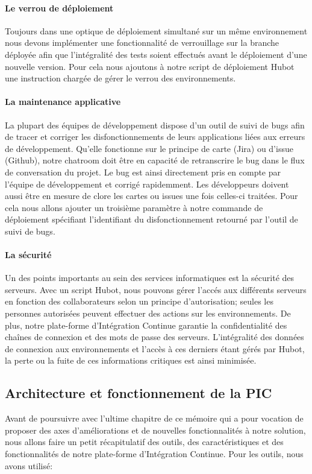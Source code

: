           \paragraph{Le verrou de déploiement} Toujours dans une optique de déploiement simultané sur un même environnement nous devons implémenter une fonctionnalité de verrouillage sur la branche déployée afin que l'intégralité des tests soient effectués avant le déploiement d'une nouvelle version. Pour cela nous ajoutons à notre script de déploiement Hubot une instruction chargée de gérer le verrou des environnements.

          \paragraph{La maintenance applicative} La plupart des équipes de développement dispose d'un outil de suivi de bugs afin de tracer et corriger les disfonctionnements de leurs applications liées aux erreurs de développement. Qu'elle fonctionne sur le principe de carte (Jira) ou d'issue (Github), notre chatroom doit être en capacité de retranscrire le bug dans le flux de conversation du projet. Le bug est ainsi directement pris en compte par l'équipe de développement et corrigé rapidemment. Les développeurs doivent aussi être en mesure de clore les cartes ou issues une fois celles-ci traitées. Pour cela nous allons ajouter un troisième paramètre à notre commande de déploiement spécifiant l'identifiant du disfonctionnement retourné par l'outil de suivi de bugs.

          \paragraph{La sécurité} Un des points importants au sein des services informatiques est la sécurité des serveurs. Avec un script Hubot, nous pouvons gérer l'accés aux différents serveurs en fonction des collaborateurs selon un principe d'autorisation; seules les personnes autorisées peuvent effectuer des actions sur les environnements. De plus, notre plate-forme d'Intégration Continue garantie la confidentialité des chaînes de connexion et des mots de passe des serveurs. L'intégralité des données de connexion aux environnements et l'accès à ces derniers étant gérés par Hubot, la perte ou la fuite de ces informations critiques est ainsi minimisée.

      \subsection{Architecture et fonctionnement de la PIC}
      Avant de poursuivre avec l'ultime chapitre de ce mémoire qui a pour vocation de proposer des axes d'améliorations et de nouvelles fonctionnalités à notre solution, nous allons faire un petit récapitulatif des outils, des caractéristiques et des fonctionnalités de notre plate-forme d'Intégration Continue. Pour les outils, nous avons utilisé:\\

